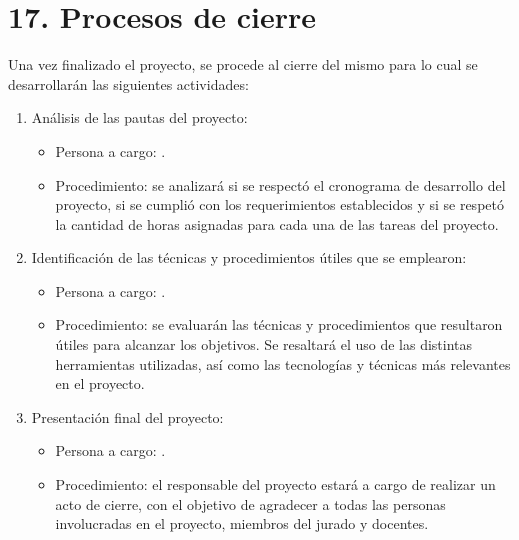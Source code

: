 \documentclass[11pt]{charter}
\begin{document}
\section{17. Procesos de cierre}    
\label{sec:cierre}
Una vez finalizado el proyecto, se procede al cierre del mismo para lo cual se desarrollarán las siguientes actividades:
\begin{enumerate}
\item Análisis de las pautas del proyecto:
\begin{itemize}
\item Persona a cargo: \authorname.
\item Procedimiento: se analizará si se respectó el cronograma de desarrollo del proyecto, si se cumplió con los requerimientos establecidos
y si se respetó la cantidad de horas asignadas para cada una de las tareas del proyecto.  
\end{itemize} 
\item Identificación de las técnicas y procedimientos útiles que se emplearon:
\begin{itemize}
\item Persona a cargo: \authorname.
\item Procedimiento: se evaluarán las técnicas y procedimientos que resultaron útiles para alcanzar los objetivos. Se resaltará el uso de las distintas herramientas utilizadas, así como las tecnologías y técnicas más relevantes en el proyecto.

  
\end{itemize} 
\item Presentación final del proyecto: 
\begin{itemize}
\item Persona a cargo: \authorname.
\item Procedimiento: el responsable del proyecto estará a cargo de realizar un acto de cierre, con el objetivo de agradecer a todas las personas involucradas en el proyecto, miembros del jurado y docentes.  
\end{itemize}  
  
\end{enumerate}
\end{document}
